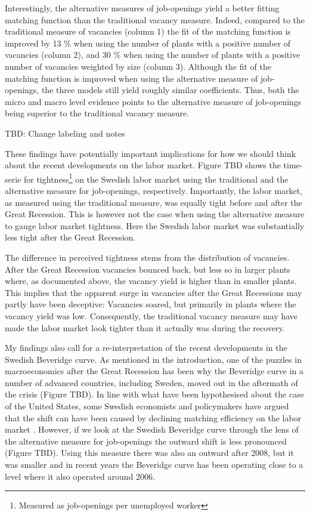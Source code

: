 Interestingly, the alternative measures of job-openings yield a better fitting matching function than the traditional vacancy measure. Indeed, compared to the traditional measure of vacancies (column 1) the fit of the matching function is improved by 13 \% when using the number of plants with a positive number of vacancies (column 2), and 30 \% when using the number of plants with a positive number of vacancies weighted by size (column 3). Although the fit of the matching function is improved when using the alternative measure of job-openings, the three models still yield roughly similar coefficients. Thus, both the micro and macro level evidence points to the alternative measure of job-openings being superior to the traditional vacancy measure. 


TBD: Change labeling and notes

These findings have potentially important implications for how we should think about the recent developments on the labor market. Figure TBD shows the time-serie for tightness\footnote{Measured as job-openings per unemployed worker} on the Swedish labor market using the traditional and the alternative measure for job-openings, respectively. Importantly, the labor market, as measured using the traditional measure, was equally tight before and after the Great Recession. This is however not the case when using the alternative measure to gauge labor market tightness. Here the Swedish labor market was substantially less tight after the Great Recession. 

The difference in perceived tightness stems from the distribution of vacancies. After the Great Recession vacancies bounced back, but less so in larger plants where, as documented above, the vacancy yield is higher than in smaller plants. This implies that the apparent surge in vacancies after the Great Recessions may partly have been deceptive: Vacancies soared, but primarily in plants where the vacancy yield was low. Consequently, the traditional vacancy measure may have made the labor market look tighter than it actually was during the recovery. 

My findings also call for a re-interpretation of the recent developments in the Swedish Beveridge curve. As mentioned in the introduction, one of the puzzles in macroeconomics after the Great Recession has been why the Beveridge curve in a number of advanced countries, including Sweden, moved out in the aftermath of the crisis (Figure TBD). In line with what have been hypothesised about the case of the United States, some Swedish economists and policymakers have argued that the shift can have been caused by declining matching efficiency on the labor market \citep{Riksbank2012, Hakanson2014}. However, if we look at the Swedish Beveridge curve through the lens of the alternative measure for job-openings the outward shift is less pronounced (Figure TBD). Using this measure there was also an outward after 2008, but it was smaller and in recent years the Beveridge curve has been operating close to a level where it also operated around 2006. 

